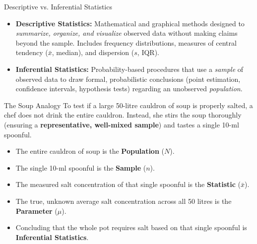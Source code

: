 \begin{definitionbox}{Descriptive vs. Inferential Statistics}
\begin{itemize}
    \item \textbf{Descriptive Statistics:} Mathematical and graphical methods designed to \emph{summarize, organize, and visualize} observed data without making claims beyond the sample. Includes frequency distributions, measures of central tendency ($\bar{x}$, median), and dispersion ($s$, IQR).
    \item \textbf{Inferential Statistics:} Probability-based procedures that use a \emph{sample} of observed data to draw formal, probabilistic conclusions (point estimation, confidence intervals, hypothesis tests) regarding an unobserved \emph{population}.
\end{itemize}
\end{definitionbox}

\begin{intuitionbox}{The Soup Analogy}
To test if a large 50-litre cauldron of soup is properly salted, a chef does not drink the entire cauldron. Instead, she stirs the soup thoroughly (ensuring a \textbf{representative, well-mixed sample}) and tastes a single 10-ml spoonful.
\begin{itemize}
    \item The entire cauldron of soup is the \textbf{Population} ($N$).
    \item The single 10-ml spoonful is the \textbf{Sample} ($n$).
    \item The measured salt concentration of that single spoonful is the \textbf{Statistic} ($\bar{x}$).
    \item The true, unknown average salt concentration across all 50 litres is the \textbf{Parameter} ($\mu$).
    \item Concluding that the whole pot requires salt based on that single spoonful is \textbf{Inferential Statistics}.
\end{itemize}
\end{intuitionbox}


